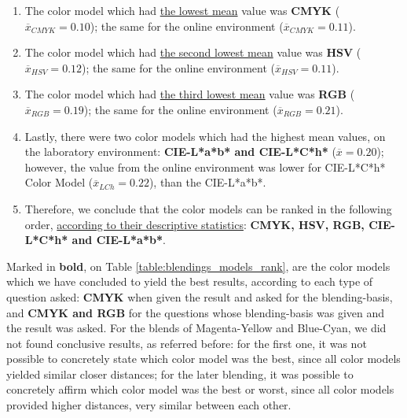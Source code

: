 \begin{enumerate}
  \setlength\itemsep{0.01em}
  \item The color model which had \ul{the lowest mean} value was \textbf{CMYK} ($\overline{x}_{CMYK} = 0.10$); the same for the online environment ($\overline{x}_{CMYK} = 0.11$).
  \item The color model which had \ul{the second lowest mean} value was \textbf{HSV} ($\overline{x}_{HSV} = 0.12$); the same for the online environment ($\overline{x}_{HSV} = 0.11$).
  \item The color model which had \ul{the third lowest mean} value was \textbf{RGB} ($\overline{x}_{RGB} = 0.19$); the same for the online environment ($\overline{x}_{RGB} = 0.21$).
  \item Lastly, there were two color models which had the highest mean values, on the laboratory environment: \textbf{CIE-L*a*b* and CIE-L*C*h*} ($\overline{x} = 0.20$); however, the value from the online environment
  was lower for CIE-L*C*h* Color Model ($\overline{x}_{LCh} = 0.22$), than the CIE-L*a*b*.
  \item Therefore, we conclude that the color models can be ranked in the following order, \ul{according to their descriptive statistics}: \textbf{CMYK, HSV, RGB, CIE-L*C*h* and CIE-L*a*b*}.
\end{enumerate} \par
%
Marked in \textbf{bold}, on Table \ref{table:blendings_models_rank}, are the color models which we have concluded to yield the best results, according to each type of question asked: \textbf{CMYK} when given the
result and asked for the blending-basis, and \textbf{CMYK and RGB} for the questions whose blending-basis was given and the result was asked. For the blends of Magenta-Yellow and Blue-Cyan, we did not found
conclusive results, as referred before: for the first one, it was not possible to concretely state which color model was the best, since all color models yielded similar closer distances; for the later blending, it was possible
to concretely affirm which color model was the best or worst, since all color models provided higher distances, very similar between each other.
%
